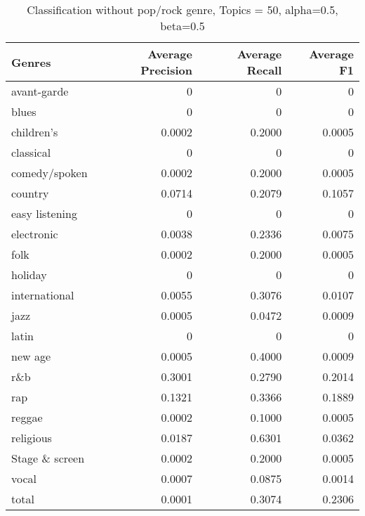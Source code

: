 
\begin{table}[h!]
\begin{tabular}{|l|r|r|r|}

\hline
\textbf{Genres} &  \textbf{Average Precision} & \textbf{Average Recall} & \textbf{Average F1} \\
\hline
avant-garde	&	0 &	0 &	0\\
blues		&	0 &	0 &	0\\
children's	&	0.0002 &	0.2000 &	0.0005\\
classical	&	0 &	0 &	0\\
comedy/spoken	&	0.0002 &	0.2000 &	0.0005\\
country		&	0.0714 &	0.2079 &	0.1057\\
easy listening	&	0 &	0 &	0\\
electronic	&	0.0038 &	0.2336 &	0.0075\\
folk		&	0.0002 &	0.2000 &	0.0005\\
holiday		&	0 & 	0 &	0\\
international	&	0.0055 &	0.3076 &	0.0107\\
jazz		&	0.0005 &	0.0472 &	0.0009\\
latin		&	0 &	0 &	0\\
new age		&	0.0005 &	0.4000 &	0.0009\\
r\&b		&	0.3001 & 	0.2790 &	0.2014\\
rap		&	0.1321 &	0.3366 &	0.1889\\
reggae		&	0.0002 &	0.1000 &	0.0005\\
religious	&	0.0187 &	0.6301 &	0.0362\\
Stage \& screen	&	0.0002 &	0.2000 &	0.0005\\
vocal		&	0.0007 &	0.0875 &	0.0014\\
total		&	0.0001 &	0.3074 &	0.2306\\
\hline
\end{tabular}
\caption{Classification without pop/rock genre, Topics = 50, alpha=0.5, beta=0.5}
\end{table}